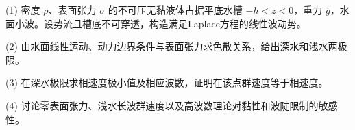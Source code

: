 (1) 密度 \(\rho\)、表面张力 \(\sigma\) 的不可压无黏液体占据平底水槽 \(-h<z<0\)，重力 \(g\)，水面小波。设势流且槽底不可穿透，构造满足Laplace方程的线性波动势。

(2) 由水面线性运动、动力边界条件与表面张力求色散关系，给出深水和浅水两极限。

(3) 在深水极限求相速度极小值及相应波数，证明在该点群速度等于相速度。

(4) 讨论零表面张力、浅水长波群速度以及高波数理论对黏性和波陡限制的敏感性。
